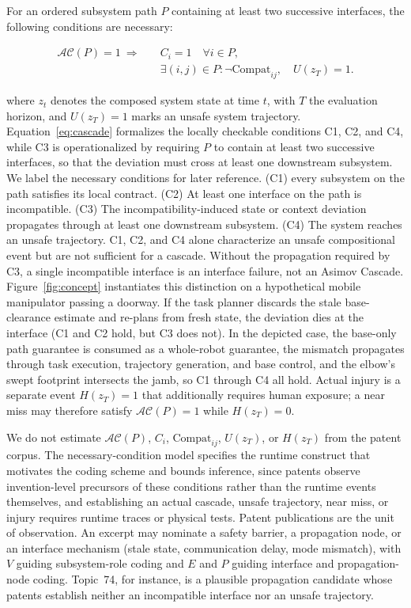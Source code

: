 \documentclass[letterpaper,9pt,conference]{ieeeconf}
\begin{document}
For an ordered subsystem path $P$ containing at least two successive interfaces, the following conditions are necessary:

\begin{equation}
\begin{aligned}
\mathcal{AC}(P) = 1\ \Rightarrow \quad & C_{i} = 1\quad \forall i \in P, \\
 & \exists(i,j) \in P:\neg\mathrm{Compat}_{ij},\quad U(z_{T}) = 1.
\end{aligned}
\label{eq:cascade}
\end{equation}

where $z_{t}$ denotes the composed system state at time $t$, with $T$ the evaluation horizon, and $U(z_{T}) = 1$ marks an unsafe system trajectory. Equation~\eqref{eq:cascade} formalizes the locally checkable conditions C1, C2, and C4, while C3 is operationalized by requiring $P$ to contain at least two successive interfaces, so that the deviation must cross at least one downstream subsystem. We label the necessary conditions for later reference. (C1) every subsystem on the path satisfies its local contract. (C2) At least one interface on the path is incompatible. (C3) The incompatibility-induced state or context deviation propagates through at least one downstream subsystem. (C4) The system reaches an unsafe trajectory. C1, C2, and C4 alone characterize an unsafe compositional event but are not sufficient for a cascade. Without the propagation required by C3, a single incompatible interface is an interface failure, not an Asimov Cascade. Figure~\ref{fig:concept} instantiates this distinction on a hypothetical mobile manipulator passing a doorway. If the task planner discards the stale base-clearance estimate and re-plans from fresh state, the deviation dies at the interface (C1 and C2 hold, but C3 does not). In the depicted case, the base-only path guarantee is consumed as a whole-robot guarantee, the mismatch propagates through task execution, trajectory generation, and base control, and the elbow's swept footprint intersects the jamb, so C1 through C4 all hold. Actual injury is a separate event $H(z_{T}) = 1$ that additionally requires human exposure; a near miss may therefore satisfy $\mathcal{AC}(P) = 1$ while $H(z_{T}) = 0$.

We do not estimate $\mathcal{AC}(P)$, $C_{i}$, $\mathrm{Compat}_{ij}$, $U(z_{T})$, or $H(z_{T})$ from the patent corpus. The necessary-condition model specifies the runtime construct that motivates the coding scheme and bounds inference, since patents observe invention-level precursors of these conditions rather than the runtime events themselves, and establishing an actual cascade, unsafe trajectory, near miss, or injury requires runtime traces or physical tests. Patent publications are the unit of observation. An excerpt may nominate a safety barrier, a propagation node, or an interface mechanism (stale state, communication delay, mode mismatch), with $V$ guiding subsystem-role coding and $E$ and $P$ guiding interface and propagation-node coding. Topic~74, for instance, is a plausible propagation candidate whose patents establish neither an incompatible interface nor an unsafe trajectory.
\end{document}
